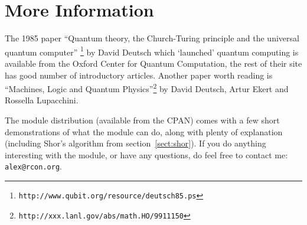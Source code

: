 \documentclass{article}      %
\newcommand{\ptt}[1]{\texttt{#1}}    %
\begin{document}
\section{More Information}

The 1985 paper ``Quantum theory, the Church-Turing principle and the
universal quantum computer''
\footnote{\ptt{http://www.qubit.org/resource/deutsch85.ps}} by David
Deutsch which `launched' quantum computing is available from the
Oxford Center for Quantum Computation, the rest of their site has good
number of introductory articles.  Another paper worth reading is
``Machines, Logic and Quantum
Physics''\footnote{\ptt{http://xxx.lanl.gov/abs/math.HO/9911150}} by
David Deutsch, Artur Ekert and Rossella Lupacchini.

The module distribution (available from the CPAN) comes with a few
short demonstrations of what the module can do, along with plenty of
explanation (including Shor's algorithm from
section~\ref{sect:shor}). If you do anything interesting with the
module, or have any questions, do feel free to contact me:
\ptt{alex@rcon.org}.
\end{document}
